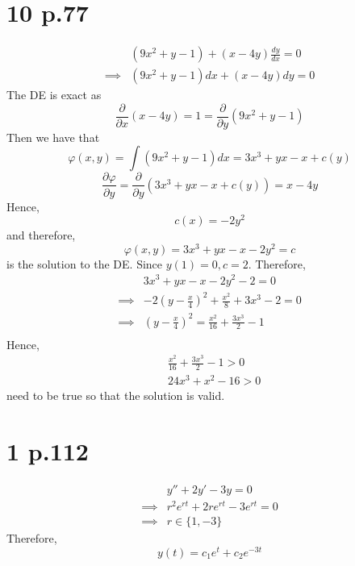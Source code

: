 \documentclass[11pt]{report}
\begin{document}
\section*{10 p.77}
\begin{equation*}
    \begin{aligned}
        &\left( 9x^2+y-1\right) + (x-4y)\frac{dy}{dx} = 0 \\
        \implies &\left( 9x^2+y-1\right)dx + (x-4y) dy = 0
    \end{aligned}
\end{equation*}
The DE is exact as
\[
    \frac{\partial}{\partial x}(x-4y) = 1 = \frac{\partial}{\partial y}\left(9x^2 + y -1\right)
\]
Then we have that
\[
    \varphi(x,y) = \int \left(9x^2 +y -1 \right) dx = 3x^3 + yx- x + c(y)
\]
\[
    \frac{\partial \varphi}{\partial y} = \frac{\partial }{\partial y}\left(3x^3 +yx-x+ c(y) \right) = x-4y
\]
Hence,
\[
    c(x) =  -2y^2
\]
and therefore,
\[
    \varphi(x,y) = 3x^3 +yx-x-2y^2 = c
\]
is the solution to the DE.
Since $y(1) = 0, c = 2$. Therefore,
\begin{equation*}
    \begin{aligned}
        &3x^3 + yx -x - 2y^2 -2= 0 \\
        \implies & -2\left(y - \frac{x}{4}\right)^2 + \frac{x^2}{8} + 3x^3 -2 = 0 \\
        \implies & \left( y -\frac{x}{4} \right)^2 = \frac{x^2}{16} + \frac{3x^3}{2} -1 \\
    \end{aligned}
\end{equation*}
Hence, 
\begin{equation*}
    \begin{aligned}
        &\frac{x^2}{16} + \frac{3x^3}{2} - 1> 0 \\
        &24x^3 + x^2 - 16 > 0
    \end{aligned}
\end{equation*}
need to be true so that the solution is valid.
\newpage
\section*{1 p.112}
\begin{equation*}
    \begin{aligned}
        &y'' +2y' - 3y = 0 \\
        \implies &r^2 e^{rt} + 2re^{rt} - 3e^{rt} = 0 \\
        \implies &r \in \{1,-3\}
    \end{aligned}
\end{equation*}
Therefore,
\[
    y(t) = c_1e^{t} + c_2e^{-3t}
\]
\newpage
\end{document}

